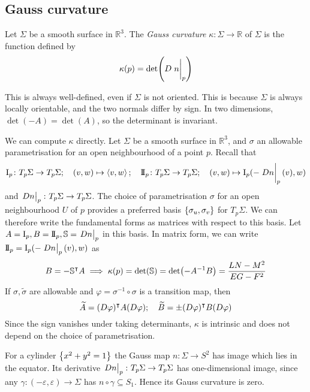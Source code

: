 \subsection{Gauss curvature}
\begin{definition}
	Let \( \Sigma \) be a smooth surface in \( \mathbb R^3 \).
	The \textit{Gauss curvature} \( \kappa \colon \Sigma \to \mathbb R \) of \( \Sigma \) is the function defined by
	\[ \kappa(p) = \det(D \eval{n}_p) \]
\end{definition}
\begin{remark}
	This is always well-defined, even if \( \Sigma \) is not oriented.
	This is because \( \Sigma \) is always locally orientable, and the two normals differ by sign.
	In two dimensions, \( \det(-A) = \det(A) \), so the determinant is invariant.
\end{remark}
We can compute \( \kappa \) directly.
Let \( \Sigma \) be a smooth surface in \( \mathbb R^3 \), and \( \sigma \) an allowable parametrisation for an open neighbourhood of a point \( p \).
Recall that
\[ \Iff_p \colon T_p \Sigma \to T_p \Sigma;\quad (v,w) \mapsto \inner{v,w};\quad \IIff_p \colon T_p \Sigma \to T_p \Sigma;\quad (v,w) \mapsto \Iff_p(-\eval{Dn}_p(v), w) \]
and \( \eval{Dn}_p \colon T_p \Sigma \to T_p \Sigma \).
The choice of parametrisation \( \sigma \) for an open neighbourhood \( U \) of \( p \) provides a preferred basis \( \qty{\sigma_u, \sigma_v} \) for \( T_p \Sigma \).
We can therefore write the fundamental forms as matrices with respect to this basis.
Let \( A = \Iff_p, B = \IIff_p, \mathbb S = \eval{Dn}_p \) in this basis.
In matrix form, we can write \( \IIff_p = \Iff_p(-\eval{Dn}_p(v),w) \) as
\[ B = -\mathbb S^\intercal A \implies \kappa(p) = \det(\mathbb S) = \det(-A^{-1}B) = \frac{LN-M^2}{EG-F^2} \]
If \( \sigma, \widetilde \sigma \) are allowable and \( \varphi = \sigma^{-1} \circ \sigma \) is a transition map, then
\[ \widetilde A = (D\varphi)^\intercal A (D \varphi);\quad \widetilde B = \pm (D\varphi)^\intercal B (D \varphi) \]
Since the sign vanishes under taking determinants, \( \kappa \) is intrinsic and does not depend on the choice of parametrisation.
\begin{example}
	For a cylinder \( \qty{x^2 + y^2 = 1} \) the Gauss map \( n \colon \Sigma \to S^2 \) has image which lies in the equator.
	Its derivative \( \eval{Dn}_p \colon T_p \Sigma \to T_p \Sigma \) has one-dimensional image, since any \( \gamma \colon (-\varepsilon, \varepsilon) \to \Sigma \) has \( n \circ \gamma \subseteq S_1 \).
	Hence its Gauss curvature is zero.
\end{example}
